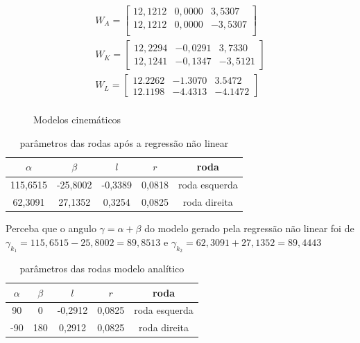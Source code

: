 \begin{figure}[H]
    \label{fig:parametros:da:cinemantica}
    \begin{align*}
        W_{A} = 
        \begin{bmatrix}
            12,1212 &  0,0000 & 3,5307 \\
            12,1212 &  0,0000 & -3,5307 \\
        \end{bmatrix}\\
        W_{K} = 
        \begin{bmatrix}
            12,2294 &  -0,0291 & 3,7330 \\
            12,1241 &  -0,1347 & -3,5121
        \end{bmatrix}\\
        W_{L} = 
        \begin{bmatrix}
            12.2262 &  -1.3070 & 3.5472 \\
            12.1198 &  -4.4313 & -4.1472
        \end{bmatrix}\\
    \end{align*}
    \caption{Modelos cinemáticos}
\end{figure}

\begin{table}[H]
    \label{table:param:kinematic}
    \centering
    \begin{tabular}{c|c|c|c|c}
        \hline
         $\alpha$ &$\beta$ &$l$ &$r$ & roda \\
        \hline
        115,6515 &-25,8002 &-0,3389 &0,0818 & roda esquerda \\
        \hline
        62,3091  &27,1352 &0,3254 &0,0825 & roda direita \\
        \hline
    \end{tabular}
    \caption{parâmetros das rodas após a regressão não linear}
\end{table}
Perceba que o angulo $\gamma = \alpha + \beta$ do modelo gerado pela regressão não
linear foi de $\gamma_{k_1} = 115,6515 -25,8002  = 89,8513$ e 
$\gamma_{k_2} = 62,3091 +27,1352 = 89,4443$
\begin{table}[H]
    \label{table:param:analytic}
    \centering
    \begin{tabular}{c|c|c|c|c}
        \hline
         $\alpha$ &$\beta$ &$l$ &$r$ & roda \\
        \hline
        90 & 0 &-0,2912 &0,0825 & roda esquerda \\
        \hline
        -90  & 180 & 0,2912 &0,0825 & roda direita \\
        \hline
    \end{tabular}
    \caption{parâmetros das rodas modelo analítico}
\end{table}


